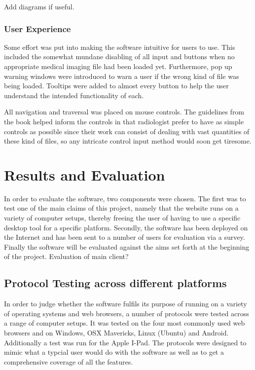 \documentclass[a4paper,11pt,titlepage]{article}
\begin{document}
Add diagrams if useful.





\subsubsection{User Experience}

Some effort was put into making the software intuitive for users to use.
This included the somewhat mundane disabling of all input and buttons when no appropriate medical imaging file had been loaded yet. Furthermore, pop up warning windows were introduced to warn a user if the wrong kind of file was being loaded. Tooltips were added to almost every button to help the user understand the intended functionality of each.

All navigation and traversal was placed on mouse controls. The guidelines from the book helped inform the controls in that radiologist prefer to have as simple controls as possible since their work can consist of dealing with vast quantities of these kind of files, so any intricate control input method would soon get tiresome.














\section{Results and Evaluation}

In order to evaluate the software, two components were chosen. The first was to test one of the main claims of this project, namely that the website runs on a variety of computer setups, thereby freeing the user of having to use a specific desktop tool for a specific platform. Secondly, the software has been deployed on the Internet and has been sent to a number of users for evaluation via a survey. Finally the software will be evaluated against the aims set forth at the beginning of the project.
Evaluation of main client?


\subsection{Protocol Testing across different platforms}

In order to judge whether the software fulfils its purpose of running on a variety of operating systems and web browsers, a number of protocols were tested across a range of computer setups. It was tested on the four most commonly used web browsers and on Windows, OSX Mavericks, Linux (Ubuntu) and Android. Additionally a test was run for the Apple I-Pad. The protocols were designed to mimic what a typcial user would do with the software as well as to get a comprehensive coverage of all the features.
\end{document}
